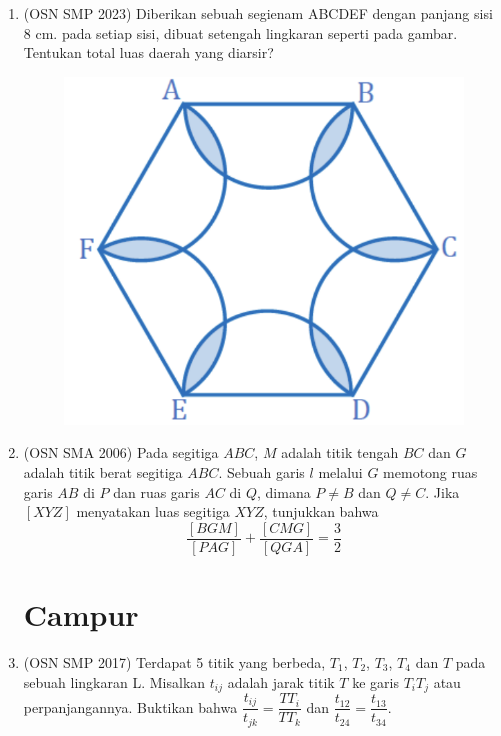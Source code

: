 \documentclass[a4paper, 12pt]{article}
\begin{document}
\begin{enumerate}
    \item (OSN SMP 2023) Diberikan sebuah segienam ABCDEF dengan panjang sisi 8 cm. pada setiap sisi, dibuat setengah lingkaran seperti pada gambar. Tentukan total luas daerah yang diarsir?
    \begin{figure}[H]
    \centering
    \includegraphics[scale=0.5]{0Figure/osn-smp-2023-1.png}
    \end{figure}
    
    \item (OSN SMA 2006)
    Pada segitiga $ABC$, $M$ adalah titik tengah $BC$ dan $G$ adalah titik berat segitiga $ABC$. Sebuah garis $l$ melalui $G$ memotong ruas garis $AB$ di $P$ dan ruas garis $AC$ di $Q$, dimana $P \neq B$ dan $Q \neq C$. Jika $[XYZ]$ menyatakan luas segitiga $XYZ$, tunjukkan bahwa
    $$
    \frac{[BGM]}{[PAG]} + \frac{[CMG]}{[QGA]} = \frac{3}{2}
    $$

    \newpage
    \section{Campur}


    \item (OSN SMP 2017) Terdapat 5 titik yang berbeda, $T_{1}$, $T_{2}$, $T_{3}$, $T_{4}$ dan $T$ pada sebuah lingkaran L. Misalkan $t_{ij}$ adalah jarak titik $T$ ke garis $T_{i}T_{j}$ atau perpanjangannya. Buktikan bahwa $\dfrac{t_{ij}}{t_{jk}}=\dfrac{TT_{i}}{TT_{k}}$ dan $\dfrac{t_{12}}{t_{24}}=\dfrac{t_{13}}{t_{34}}$.
    \newline
\end{enumerate}
\end{document}
